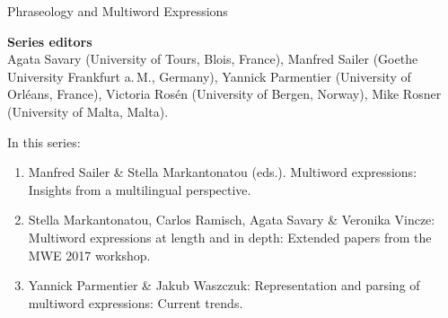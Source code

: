 {\large Phraseology and Multiword Expressions}

\bigskip

\textbf{Series editors}\\
    Agata Savary (University of Tours, Blois, France),
    Manfred Sailer (Goethe University Frankfurt a.\,M., Germany),
    Yannick Parmentier (University of Orléans, France),
    Victoria Rosén (University of Bergen, Norway),
    Mike Rosner (University of Malta, Malta).

  \bigskip

In this series:

\begin{enumerate}
\item Manfred Sailer \& Stella Markantonatou (eds.). Multiword expressions: Insights from a multilingual perspective.
\item Stella Markantonatou, Carlos Ramisch, Agata Savary \& Veronika Vincze:  Multiword expressions at length and in depth: Extended papers from the MWE 2017 workshop.
\item Yannick Parmentier \& Jakub Waszczuk: Representation and parsing of multiword expressions: Current trends.   
\end{enumerate}


